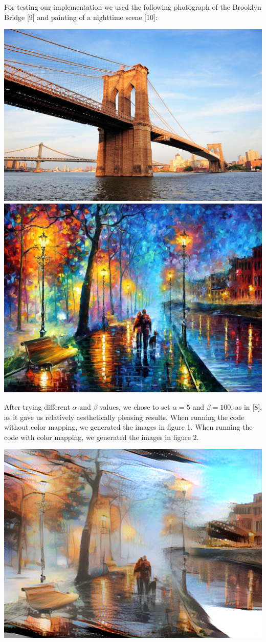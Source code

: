 \documentclass[10pt,twocolumn,letterpaper]{article}
\begin{document}
For testing our implementation we used the following photograph of the Brooklyn Bridge [9] and painting of a nighttime scene [10]: \\
\begin{center}
\includegraphics[width=0.8\linewidth]{content1.jpg}
\includegraphics[width=0.8\linewidth]{style1.jpeg}
\end{center}

After trying different $\alpha$ and $\beta$ values, we chose to set $\alpha = 5$ and $\beta = 100$, as in [8], as it gave us relatively aesthetically pleasing results. When running the code without color mapping, we generated the images in figure 1. When running the code with color mapping, we generated the images in figure 2.

\begin{center}
\includegraphics[width=0.8\linewidth]{brooklyn_night/out.png}
\end{center}
\end{document}
